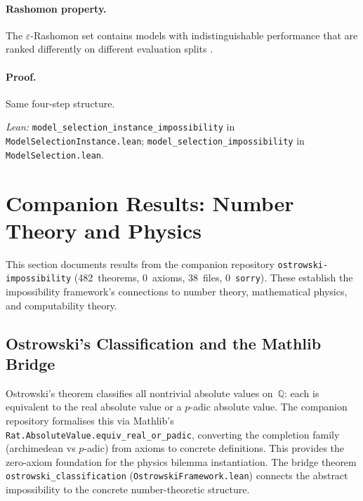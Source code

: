 \documentclass[11pt,a4paper]{article}
\begin{document}
\paragraph{Rashomon property.}
The $\varepsilon$-Rashomon set contains models with indistinguishable
performance that are ranked differently on different evaluation splits
\citep{fisher2019models,rudin2024amazing,semenova2022existence}.

\paragraph{Proof.}
Same four-step structure.

{\raggedright\noindent\textit{Lean:}
\texttt{model\_selection\_instance\_impossibility}
in \texttt{ModelSelectionInstance.lean};
\texttt{model\_selection\_impossibility}
in \texttt{ModelSelection.lean}.\par}


\section{Companion Results: Number Theory and Physics}
\label{sec:companion-physics}

This section documents results from the companion repository \texttt{ostrowski-impossibility} (482~theorems, 0~axioms, 38~files, 0~\texttt{sorry}).  These establish the impossibility framework's connections to number theory, mathematical physics, and computability theory.

\subsection{Ostrowski's Classification and the Mathlib Bridge}

Ostrowski's theorem classifies all nontrivial absolute values on~$\mathbb{Q}$: each is equivalent to the real absolute value or a $p$-adic absolute value.  The companion repository formalises this via Mathlib's \texttt{Rat.AbsoluteValue.equiv\_real\_or\_padic}, converting the completion family (archimedean vs $p$-adic) from axioms to concrete definitions.  This provides the zero-axiom foundation for the physics bilemma instantiation.  The bridge theorem \texttt{ostrowski\_classification} (\texttt{OstrowskiFramework.lean}) connects the abstract impossibility to the concrete number-theoretic structure.
\end{document}
